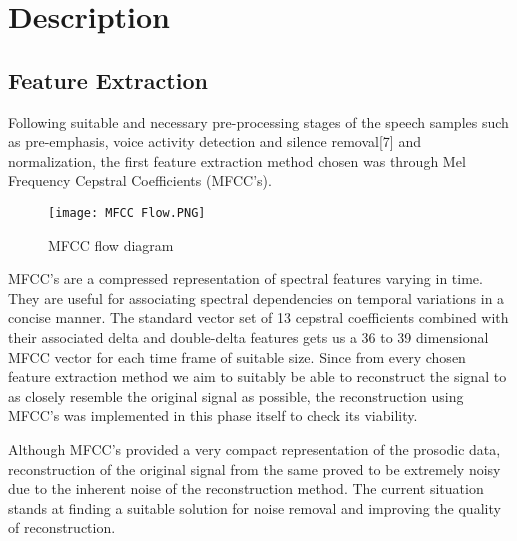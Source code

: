 \documentclass[BTech]{nitkdiss}
\begin{document}
\chapter{\vspace{10px} Description}

\section{Feature Extraction}

Following suitable and necessary pre-processing stages of the speech samples such as pre-emphasis, voice activity detection and silence removal[7] and normalization, the first feature extraction method chosen was through Mel Frequency Cepstral Coefficients (MFCC's).

\begin{figure}[H]
\centering
\texttt{[image: MFCC Flow.PNG]}
\caption{MFCC flow diagram}
\end{figure}

MFCC's are a compressed representation of spectral features varying in time. They are useful for associating spectral dependencies on temporal variations in a concise manner. The standard vector set of 13 cepstral coefficients combined with their associated delta and double-delta features gets us a 36 to 39 dimensional MFCC vector for each time frame of suitable size. Since from every chosen feature extraction method we aim to suitably be able to reconstruct the signal to as closely resemble the original signal as possible, the reconstruction using MFCC's was implemented in this phase itself to check its viability.

\hfill
{}

Although MFCC's provided a very compact representation of the prosodic data, reconstruction of the original signal from the same proved to be extremely noisy due to the inherent noise of the reconstruction method. The current situation stands at finding a suitable solution for noise removal and improving the quality of reconstruction.
\end{document}

